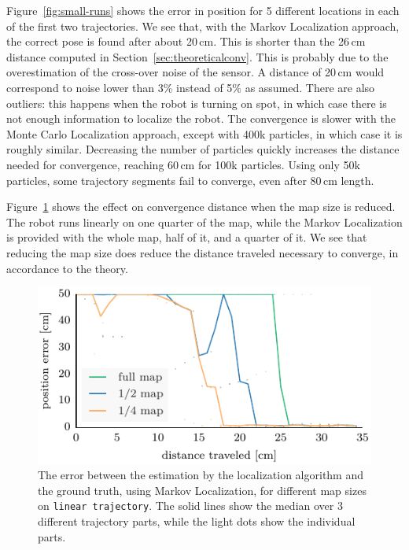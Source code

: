 \documentclass[letterpaper, 10pt, conference]{ieeeconf}
\newcommand{\Fig}[1]{Figure~\ref{fig:#1}}
\newcommand{\sect}[1]{Section~\ref{sec:#1}}
\begin{document}
\Fig{small-runs} shows the error in position for 5 different locations in each of the first two trajectories.
We see that, with the Markov Localization approach, the correct pose is found after about 20\,cm.
This is shorter than the 26\,cm distance computed in \sect{theoreticalconv}.
This is probably due to the overestimation of the cross-over noise of the sensor.
A distance of 20\,cm would correspond to noise lower than 3\% instead of 5\% as assumed.
There are also outliers: this happens when the robot is turning on spot, in which case there is not enough information to localize the robot.
The convergence is slower with the Monte Carlo Localization approach, except with 400k particles, in which case it is roughly similar.
Decreasing the number of particles quickly increases the distance needed for convergence, reaching 60\,cm for 100k particles.
Using only 50k particles, some trajectory segments fail to converge, even after 80\,cm length.

\Fig{small-maps} shows the effect on convergence distance when the map size is reduced.
The robot runs linearly on one quarter of the map, while the Markov Localization is provided with the whole map, half of it, and a quarter of it.
We see that reducing the map size does reduce the distance traveled necessary to converge, in accordance to the theory.

\begin{figure}
\includegraphics{ml-small_maps-xy}
\caption{The error between the estimation by the localization algorithm and the ground truth, using Markov Localization, for different map sizes on \texttt{linear trajectory}.
The solid lines show the median over 3 different trajectory parts, while the light dots show the individual parts.}
\label{fig:small-maps}
\end{figure}
\end{document}
